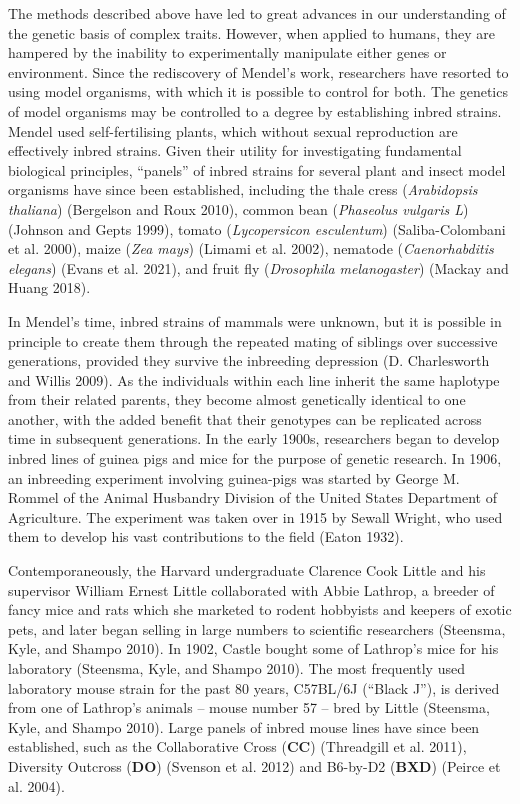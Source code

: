 \documentclass[
]{book}
\begin{document}
The methods described above have led to great advances in our understanding of the genetic basis of complex traits. However, when applied to humans, they are hampered by the inability to experimentally manipulate either genes or environment. Since the rediscovery of Mendel's work, researchers have resorted to using model organisms, with which it is possible to control for both. The genetics of model organisms may be controlled to a degree by establishing inbred strains. Mendel used self-fertilising plants, which without sexual reproduction are effectively inbred strains. Given their utility for investigating fundamental biological principles, ``panels'' of inbred strains for several plant and insect model organisms have since been established, including the thale cress (\emph{Arabidopsis thaliana}) (Bergelson and Roux 2010), common bean (\emph{Phaseolus vulgaris L}) (Johnson and Gepts 1999), tomato (\emph{Lycopersicon esculentum}) (Saliba-Colombani et al. 2000), maize (\emph{Zea mays}) (Limami et al. 2002), nematode (\emph{Caenorhabditis elegans}) (Evans et al. 2021), and fruit fly (\emph{Drosophila melanogaster}) (Mackay and Huang 2018).

In Mendel's time, inbred strains of mammals were unknown, but it is possible in principle to create them through the repeated mating of siblings over successive generations, provided they survive the inbreeding depression (D. Charlesworth and Willis 2009). As the individuals within each line inherit the same haplotype from their related parents, they become almost genetically identical to one another, with the added benefit that their genotypes can be replicated across time in subsequent generations. In the early 1900s, researchers began to develop inbred lines of guinea pigs and mice for the purpose of genetic research. In 1906, an inbreeding experiment involving guinea-pigs was started by George M. Rommel of the Animal Husbandry Division of the United States Department of Agriculture. The experiment was taken over in 1915 by Sewall Wright, who used them to develop his vast contributions to the field (Eaton 1932).

Contemporaneously, the Harvard undergraduate Clarence Cook Little and his supervisor William Ernest Little collaborated with Abbie Lathrop, a breeder of fancy mice and rats which she marketed to rodent hobbyists and keepers of exotic pets, and later began selling in large numbers to scientific researchers (Steensma, Kyle, and Shampo 2010). In 1902, Castle bought some of Lathrop's mice for his laboratory (Steensma, Kyle, and Shampo 2010). The most frequently used laboratory mouse strain for the past 80 years, C57BL/6J (``Black J''), is derived from one of Lathrop's animals -- mouse number 57 -- bred by Little (Steensma, Kyle, and Shampo 2010). Large panels of inbred mouse lines have since been established, such as the Collaborative Cross (\textbf{CC}) (Threadgill et al. 2011), Diversity Outcross (\textbf{DO}) (Svenson et al. 2012) and B6-by-D2 (\textbf{BXD}) (Peirce et al. 2004).
\end{document}
